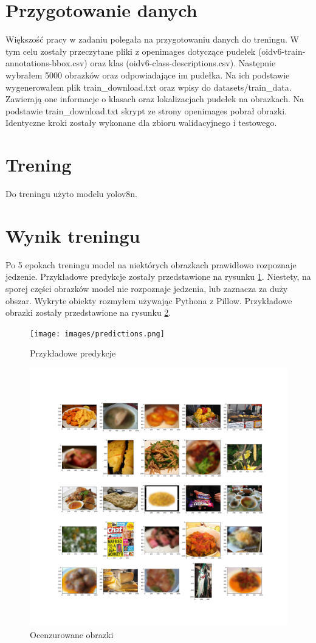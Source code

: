 \documentclass[a4paper]{article}
\begin{document}
\section{Przygotowanie danych}
Większość pracy w zadaniu polegała na przygotowaniu danych do treningu. W tym celu zostały przeczytane pliki z openimages dotyczące
pudełek (oidv6-train-annotations-bbox.csv) oraz klas (oidv6-class-descriptions.csv). Następnie wybrałem 5000 obrazków oraz
odpowiadające im pudełka. Na ich podstawie wygenerowałem plik train\_download.txt oraz wpisy do datasets/train\_data. Zawierają one
informacje o klasach oraz lokalizacjach pudełek na obrazkach. Na podstawie train\_download.txt skrypt ze strony openimages pobrał
obrazki. Identyczne kroki zostały wykonane dla zbioru walidacyjnego i testowego.

\section{Trening}

Do treningu użyto modelu yolov8n.

\section{Wynik treningu}

Po 5 epokach treningu model na niektórych obrazkach prawidłowo rozpoznaje jedzenie.
Przykładowe predykcje zostały przedstawione na rysunku \ref{fig:predictions}.
Niestety, na sporej części obrazków model nie rozpoznaje jedzenia, lub zaznacza za duży obszar.
Wykryte obiekty rozmyłem używając Pythona z Pillow. Przykładowe obrazki zostały przedstawione na rysunku \ref{fig:blurred}.

\begin{figure}[H]
    \centering
    \texttt{[image: images/predictions.png]}
    \caption{Przykładowe predykcje}
    \label{fig:predictions}
\end{figure}

\begin{figure}[H]
    \centering
    \includegraphics[width=\textwidth]{images/blurred.png}
    \caption{Ocenzurowane obrazki}
    \label{fig:blurred}
\end{figure}
\end{document}
